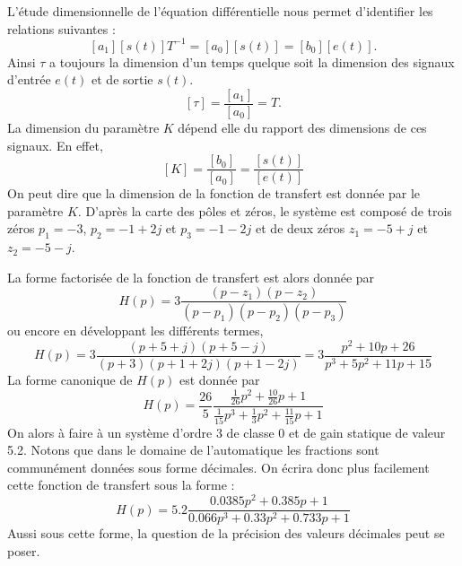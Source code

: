 L'étude dimensionnelle de l'équation différentielle nous permet d'identifier
les relations suivantes :
\[
    [a_1][s(t)] T^{-1} = [a_0][s(t)] = [b_0][e(t)].
\]
Ainsi $\tau$ a toujours la dimension d'un temps quelque soit la dimension des 
signaux d'entrée  $e(t)$ et de sortie $s(t)$.
\[
    [\tau] = \dfrac{[a_1]}{[a_0]}= T.
\]
La dimension du paramètre $K$ dépend elle du rapport des dimensions de ces 
signaux. En effet,
\[
    [K]=\dfrac{[b_0]}{[a_0]}=\dfrac{[s(t)]}{[e(t)]}
\]
On peut dire que la dimension de la fonction de transfert est donnée par 
le paramètre $K$.
D'après la carte des pôles et zéros, le système est composé de trois zéros
$p_1=-3$, $p_2=-1+2j$ et $p_3=-1-2j$ et de deux zéros $z_1=-5+j$ et $z_2=-5-j$.

La forme factorisée de la fonction de transfert est alors donnée par 
\[
    H(p)=3\dfrac{(p-z_1)(p-z_2)}{(p-p_1)(p-p_2)(p-p_3)}
\]
ou encore en développant les différents termes,
\[
    H(p)=3\dfrac{(p+5+j)(p+5-j)}{(p+3)(p+1+2j)(p+1-2j)}
        =3\dfrac{p^2+10p+26}{p^3+5p^2+11p+15}
\]
La forme canonique de $H(p)$ est donnée par 
\[
    H(p)=\dfrac{26}{5}\dfrac{\frac{1}{26}p^2+\frac{10}{26}p+1}
                            {\frac{1}{15}p^3+\frac{1}{3}p^2+\frac{11}{15}p+1}
\]
On alors à faire à un système d'ordre 3 de classe 0 et de gain statique 
de valeur 5.2. 
Notons que dans le domaine de l'automatique les fractions sont communément
données sous forme décimales. On écrira donc plus facilement cette fonction
de transfert sous la forme :
\[
    H(p)=5.2\dfrac{0.0385p^2+0.385p+1}{0.066p^3+0.33p^2+0.733p+1}
\]
Aussi sous cette forme, la question de la précision des valeurs décimales 
peut se poser. 
